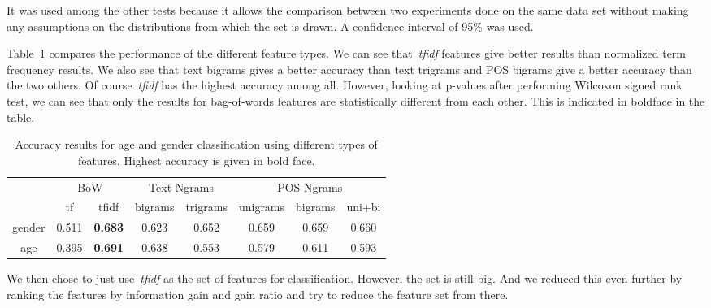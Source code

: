 \documentclass[a4paper]{llncs}
\begin{document}
It was used among the other tests because it allows the comparison between two experiments done on the same data set without making any assumptions on the distributions from which the set is drawn. A confidence interval of 95\% was used.

Table~\ref{table:DiffFeaturesResults} compares the performance of the different feature types. We can see that~\textit{tfidf} features give better results than normalized term frequency results. We also see that text bigrams gives a better accuracy than text trigrams and POS bigrams give a better accuracy than the two others. Of course~\textit{tfidf} has the highest accuracy among all. However, looking at p-values after performing Wilcoxon signed rank test, we can see that only the results for bag-of-words features are statistically different from each other. This is indicated in boldface in the table. 


\begin{table}[]
\centering
\begin{tabular}{|l|cc|cc|ccc|}
\hline
\multirow{2}{*}{}            & \multicolumn{2}{c|}{BoW} & \multicolumn{2}{c|}{Text Ngrams} & \multicolumn{3}{c|}{POS Ngrams} \\ %
                             & tf     & tfidf           & bigrams        & trigrams        & unigrams   & bigrams  & uni+bi  \\ \hline
\multicolumn{1}{|c|}{gender} & 0.511  & \textbf{0.683}  & 0.623          & 0.652           & 0.659      & 0.659    & 0.660   \\ %
\multicolumn{1}{|c|}{age}    & 0.395  & \textbf{0.691}  & 0.638          & 0.553           & 0.579      & 0.611    & 0.593   \\ \hline
\end{tabular}
\caption{Accuracy results for age and gender classification using different types of features. Highest accuracy is given in bold face.}
\label{table:DiffFeaturesResults}
\end{table}

We then chose to just use~\textit{tfidf} as the set of features for classification. However, the set is still big. And we reduced this even further by ranking the features by information gain and gain ratio and try to reduce the feature set from there.  
\end{document}
